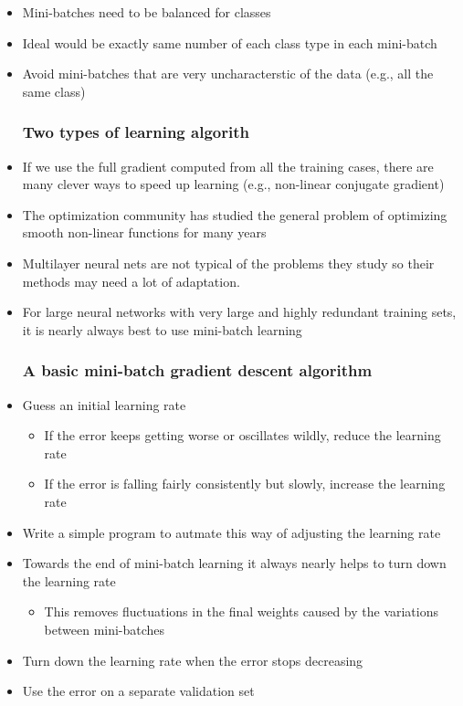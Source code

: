 \begin{itemize}
	\item Mini-batches need to be balanced for classes
	\item Ideal would be exactly same number of each class type in each mini-batch
	\item Avoid mini-batches that are very uncharacterstic of the data (e.g., all the same class)

	\subsubsection{Two types of learning algorith}
	\item If we use the full gradient computed from all the training cases, there are many clever ways to speed up learning (e.g., non-linear conjugate gradient)
	\item The optimization community has studied the general problem of optimizing smooth non-linear functions for many years
	\item Multilayer neural nets are not typical of the problems they study so their methods may need a lot of adaptation.
	\item For large neural networks with very large and highly redundant training sets, it is nearly always best to use mini-batch learning

	\subsubsection{A basic mini-batch gradient descent algorithm}
	\item Guess an initial learning rate
	\begin{itemize}
		\item If the error keeps getting worse or oscillates wildly, reduce the learning rate
		\item If the error is falling fairly consistently but slowly, increase the learning rate
	\end{itemize}
	\item Write a simple program to autmate this way of adjusting the learning rate
	\item Towards the end of mini-batch learning it always nearly helps to turn down the learning rate
	\begin{itemize}
		\item This removes fluctuations in the final weights caused by the variations between mini-batches
	\end{itemize}
	\item Turn down the learning rate when the error stops decreasing
	\item Use the error on a separate validation set
\end{itemize}